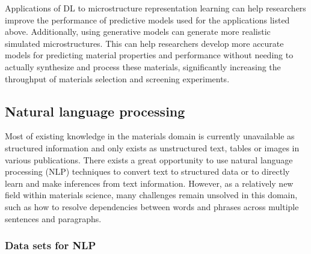 \documentclass[pdflatex,sn-mathphys]{sn-jnl}%
\theoremstyle{thmstyleone}%
\theoremstyle{thmstyletwo}%
\theoremstyle{thmstylethree}%
\begin{document}
Applications of DL to microstructure representation learning can help researchers improve the performance of predictive models used for the applications listed above. Additionally, using generative models can generate more realistic simulated microstructures. This can help researchers develop more accurate models for predicting material properties and performance without needing to actually synthesize and process these materials, significantly increasing the throughput of materials selection and screening experiments.














\subsection{Natural language processing}\label{sec:nlp}

Most of existing knowledge in the materials domain is currently unavailable as structured information and only exists as unstructured text, tables or images in various publications. There exists a great opportunity to use natural language processing (NLP) techniques to convert text to structured data or to directly learn and make inferences from text information. However, as a relatively new field within materials science, many challenges remain unsolved in this domain, such as how to resolve dependencies between words and phrases across multiple sentences and paragraphs.


\subsubsection{Data sets for NLP}
\end{document}
